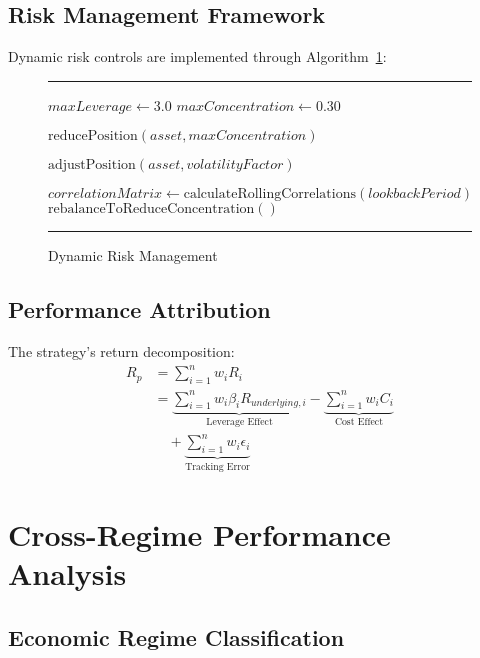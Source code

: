 \documentclass[onecolumn,11pt]{IEEEtran}
\renewenvironment{algorithm}[1][h]
  {\begin{figure}[#1]
   \centering
   \begin{minipage}{0.9\textwidth}
   \hrule
   \vspace{0.3em}}
  {\vspace{0.3em}
   \hrule
   \end{minipage}
   \end{figure}}
\begin{document}
\subsection{Risk Management Framework}

Dynamic risk controls are implemented through Algorithm~\ref{alg:risk}:

\begin{algorithm}[h]
\caption{Dynamic Risk Management}
\label{alg:risk}
\begin{algorithmic}[1]
    \State $maxLeverage \gets 3.0$
    \State $maxConcentration \gets 0.30$
    
            \State $\text{reducePosition}(asset, maxConcentration)$
        \EndIf
        
            \State $\text{adjustPosition}(asset, volatilityFactor)$
        \EndIf
    \EndFor
    
    \State $correlationMatrix \gets \text{calculateRollingCorrelations}(lookbackPeriod)$
        \State $\text{rebalanceToReduceConcentration}()$
    \EndIf
\EndFunction
\end{algorithmic}
\end{algorithm}

\subsection{Performance Attribution}

The strategy's return decomposition:
\begin{align}
R_p &= \sum_{i=1}^n w_i R_i \\
&= \underbrace{\sum_{i=1}^n w_i \beta_i R_{underlying,i}}_{\text{Leverage Effect}} - \underbrace{\sum_{i=1}^n w_i C_i}_{\text{Cost Effect}} \\
&\quad + \underbrace{\sum_{i=1}^n w_i \epsilon_i}_{\text{Tracking Error}}
\end{align}

\section{Cross-Regime Performance Analysis}

\subsection{Economic Regime Classification}
\end{document}
